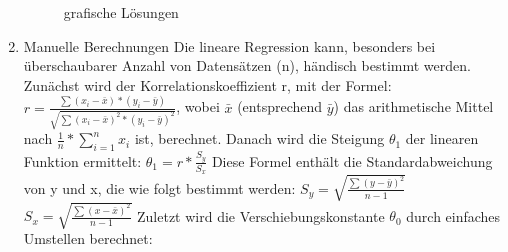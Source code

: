 \documentclass[a4paper]{scrreprt}
\begin{document}
\begin{enumerate}
\begin{figure}[htbp]
\caption{grafische Lösungen}
\end{figure}
\newpage
\item Manuelle Berechnungen\newline
Die lineare Regression kann, besonders bei überschaubarer Anzahl von Datensätzen (n), händisch bestimmt werden. Zunächst wird der Korrelationskoeffizient r, mit der Formel:
$r= \frac{\sum (x_i-\bar{x})*(y_i-\bar{y})}{\sqrt{\sum (x_i-\bar{x})^{2}*(y_i-\bar{y})^{2}}}$,
wobei $\bar{x}$ (entsprechend $\bar{y}$) das arithmetische Mittel nach $\frac{1}{n}*\sum_{i=1}^{n} x_i$
ist, berechnet. Danach wird die Steigung $\theta_{1}$ der linearen Funktion ermittelt:\newline
$\theta_{1}= r*\frac{S_{y}}{S_{x}}$\newline
Diese Formel enthält die Standardabweichung von y und x, die wie folgt bestimmt werden:\newline
$S_{y}= \sqrt{\frac{\sum (y-\bar{y})^{2}}{n-1}}$\newline
$S_{x}= \sqrt{\frac{\sum (x-\bar{x})^{2}}{n-1}}$\newline
Zuletzt wird die Verschiebungskonstante $\theta_{0}$ durch einfaches Umstellen berechnet:\newline

\end{enumerate}
\end{document}
